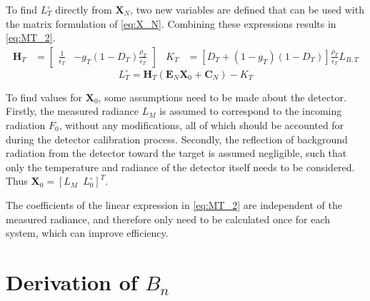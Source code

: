 \documentclass[11pt,a4paper]{article}
\begin{document}
To find $ L^\circ_T $ directly from $ \bm{X}_N $, two new variables are defined that can be used with the matrix formulation of \cref{eq:X_N}. Combining these expressions results in \cref{eq:MT_2}.
\begin{align*}
	\bm{H}_T &=
	\begin{bmatrix}
		\frac{1}{\epsilon_T} & - g_T \left(1 - D_T\right) \frac{\rho_T}{\epsilon_T}
	\end{bmatrix}
&
K_T &= \left[D_T + \left(1 - g_T\right)\left(1 - D_T\right) \right] \frac{\rho_T}{\epsilon_T} L_{B,T}
\end{align*}
\begin{equation}\label{eq:MT_2}
	L^\circ_T = \bm{H}_T \left( \bm{E}_N \bm{X}_0 + \bm{C}_N \right) - K_T
\end{equation}

To find values for $ \bm{X}_0 $, some assumptions need to be made about the detector. Firstly, the measured radiance $ L_M $ is assumed to correspond to the incoming radiation $ F_0 $, without any modifications, all of which should be accounted for during the detector calibration process. Secondly, the reflection of background radiation from the detector toward the target is assumed negligible, such that only the temperature and radiance of the detector itself needs to be considered. Thus $ \bm{X}_0 = \left[ L_M \enspace L^\circ_0 \right]^T $.

The coefficients of the linear expression in \cref{eq:MT_2} are independent of the measured radiance, and therefore only need to be calculated once for each system, which can improve efficiency.

\appendix
{}

\section{Derivation of $ B_n $}\label{sec:Bn}
\end{document}
